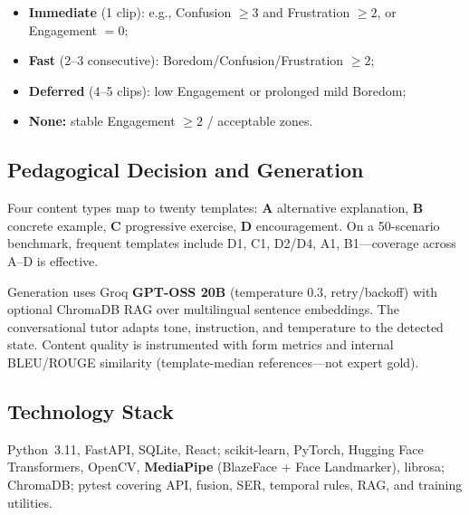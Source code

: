\documentclass[conference]{IEEEtran}
\begin{document}
\begin{itemize}
\item \textbf{Immediate} (1 clip): e.g., Confusion $\ge 3$ and Frustration
$\ge 2$, or Engagement $=0$;
\item \textbf{Fast} (2--3 consecutive): Boredom/Confusion/Frustration $\ge 2$;
\item \textbf{Deferred} (4--5 clips): low Engagement or prolonged mild Boredom;
\item \textbf{None:} stable Engagement $\ge 2$ / acceptable zones.
\end{itemize}

\subsection{Pedagogical Decision and Generation}
Four content types map to twenty templates: \textbf{A} alternative explanation,
\textbf{B} concrete example, \textbf{C} progressive exercise, \textbf{D}
encouragement. On a 50-scenario benchmark, frequent templates include D1, C1,
D2/D4, A1, B1---coverage across A--D is effective.

Generation uses Groq \textbf{GPT-OSS 20B} (temperature $0.3$, retry/backoff)
with optional ChromaDB RAG over multilingual sentence embeddings. The
conversational tutor adapts tone, instruction, and temperature to the detected
state. Content quality is instrumented with form metrics and internal
BLEU/ROUGE similarity (template-median references---not expert gold).

\subsection{Technology Stack}
Python~3.11, FastAPI, SQLite, React; scikit-learn, PyTorch, Hugging Face
Transformers, OpenCV, \textbf{MediaPipe} (BlazeFace + Face Landmarker),
librosa; ChromaDB; pytest covering API, fusion, SER, temporal rules, RAG, and
training utilities.
\end{document}
